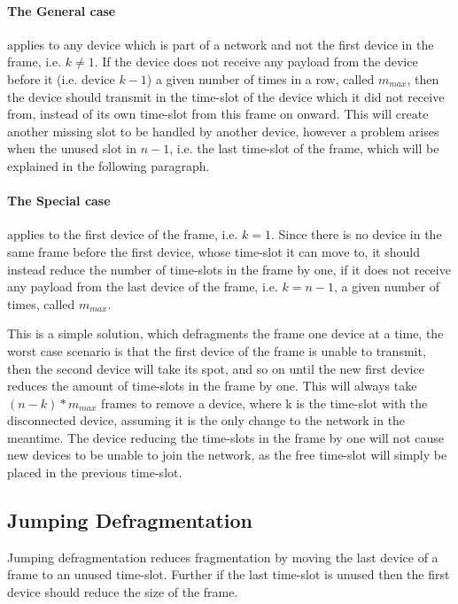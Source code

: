 \paragraph{The General case}applies to any device which is part of a network and not the first device in the frame, i.e. $k \neq 1$.
If the device does not receive any payload from the device before it (i.e. device $k - 1$) a given number of times in a row, called $m_{max}$, then the device should transmit in the time-slot of the device which it did not receive from, instead of its own time-slot from this frame on onward. 
This will create another missing slot to be handled by another device, however a problem arises when the unused slot in $n - 1$, i.e. the last time-slot of the frame, which will be explained in the following paragraph.

\paragraph{The Special case}applies to the first device of the frame, i.e. $k = 1$. 
Since there is no device in the same frame before the first device, whose time-slot it can move to, it should instead reduce the number of time-slots in the frame by one, if it does not receive any payload from the last device of the frame, i.e. $k = n - 1$, a given number of times, called $m_{max}$. 


\bigskip

This is a simple solution, which defragments the frame one device at a time, the worst case scenario is that the first device of the frame is unable to transmit, then the second device will take its spot, and so on until the new first device reduces the amount of time-slots in the frame by one. 
This will always take $(n - k) * m_{max}$ frames to remove a device, where k is the time-slot with the disconnected device, assuming it is the only change to the network in the meantime. 
The device reducing the time-slots in the frame by one will not cause new devices to be unable to join the network, as the free time-slot will simply be placed in the previous time-slot. 

\subsection{Jumping Defragmentation}
Jumping defragmentation reduces fragmentation by moving the last device of a frame to an unused time-slot. Further if the last time-slot is unused then the first device should reduce the size of the frame.

